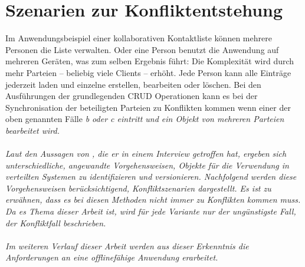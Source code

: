 \section{\label{chap:konfliktszenarien}Szenarien zur Konfliktentstehung}
Im Anwendungsbeispiel einer kollaborativen Kontaktliste können mehrere Personen die Liste verwalten. Oder eine Person benutzt die Anwendung auf mehreren Geräten, was zum selben Ergebnis führt:
Die Komplexität wird durch mehr Parteien -- beliebig viele Clients -- erhöht.
Jede Person kann alle Einträge jederzeit laden und einzelne erstellen, bearbeiten oder löschen. Bei den Ausführungen der grundlegenden \gls{CRUD} Operationen kann es bei der Synchronisation der beteiligten Parteien zu Konflikten kommen wenn einer der oben genannten Fälle \it{b} oder \it{c} eintritt und ein Objekt von mehreren Parteien bearbeitet wird.\\\\
Laut den Aussagen von , die er in einem Interview getroffen hat, ergeben sich unterschiedliche, angewandte Vorgehensweisen, Objekte für die Verwendung in verteilten Systemen zu identifizieren und versionieren.
Nachfolgend werden diese Vorgehensweisen berücksichtigend, Konfliktszenarien dargestellt.
Es ist zu erwähnen, dass es bei diesen Methoden nicht immer zu Konflikten kommen muss.
Da es Thema dieser Arbeit ist, wird für jede Variante nur der ungünstigste Fall, der Konfliktfall beschrieben.
%
\\\\
Im weiteren Verlauf dieser Arbeit werden aus dieser Erkenntnis die Anforderungen an eine offlinefähige Anwendung erarbeitet.